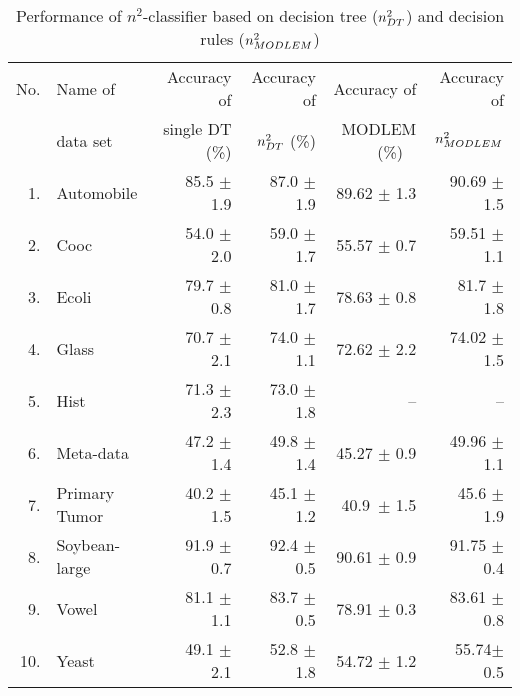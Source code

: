 \documentclass{article}
\begin{document}
\begin{table}
\caption{Performance of $n^2$-classifier based on decision tree ($n^2_{\tiny DT}$)
 and decision rules ($n^2_{\tiny MODLEM}$)}
\vspace{2pt}
\begin{tabular}{rlrrrr}
\hline
No. & Name of & Accuracy of &\quad   Accuracy of &\quad   Accuracy of &\quad
Accuracy of \\
 & data set & single DT  (\%)  &\quad $n^2_{\tiny DT}$ (\%) &\quad  MODLEM (\%)
 \ & $n^2_{\tiny MODLEM}$ \\ \hline
1. & Automobile & 85.5 \scriptsize{$\pm$ 1.9} & 87.0
\scriptsize{$\pm$ 1.9} & 89.62 \scriptsize{$\pm$ 1.3}& 90.69
\scriptsize{$\pm$ 1.5} \\ 2. &  Cooc & 54.0 \scriptsize{$\pm$ 2.0}
& 59.0 \scriptsize{$\pm$ 1.7} & 55.57 \scriptsize{$\pm$ 0.7} &
59.51 \scriptsize{$\pm$ 1.1} \\ 3. & Ecoli & 79.7
\scriptsize{$\pm$  0.8} & 81.0 \scriptsize{$\pm$ 1.7} & 78.63
\scriptsize{$\pm$ 0.8} & 81.7 \scriptsize{$\pm$ 1.8}\\ 4. & Glass
& 70.7 \scriptsize{$\pm$  2.1} & 74.0  \scriptsize{$\pm$ 1.1} &
72.62 \scriptsize{$\pm$ 2.2} & 74.02 \scriptsize{$\pm$ 1.5} \\ 5.
& Hist & 71.3 \scriptsize{$\pm$  2.3 }& 73.0  \scriptsize{$\pm$
1.8} & -- & -- \\ 6. & Meta-data & 47.2 \scriptsize{$\pm$ 1.4} &
49.8 \scriptsize{$\pm$ 1.4} & 45.27 \scriptsize{$\pm$ 0.9} & 49.96
\scriptsize{$\pm$ 1.1} \\ 7. & Primary Tumor & 40.2
\scriptsize{$\pm$ 1.5 }& 45.1 \scriptsize{$\pm$ 1.2} & 40.9\
\scriptsize{$\pm$ 1.5 } &  45.6 \scriptsize{$\pm$ 1.9} \\ 8. &
Soybean-large&  91.9 \scriptsize{$\pm$ 0.7 }& 92.4
\scriptsize{$\pm$ 0.5} & 90.61 \scriptsize{$\pm$ 0.9} & 91.75
\scriptsize{$\pm$ 0.4} \\ 9. & Vowel & 81.1 \scriptsize{$\pm$ 1.1}
& 83.7  \scriptsize{$\pm$ 0.5} & 78.91 \scriptsize{$\pm$ 0.3} &
83.61 \scriptsize{$\pm$ 0.8} \\ 10. & Yeast & 49.1
\scriptsize{$\pm$ 2.1} & 52.8 \scriptsize{$\pm$ 1.8} & 54.72
\scriptsize{$\pm$ 1.2} & 55.74\scriptsize{$\pm$ 0.5}
\\ \hline
\end{tabular}
\end{table}
\end{document}
